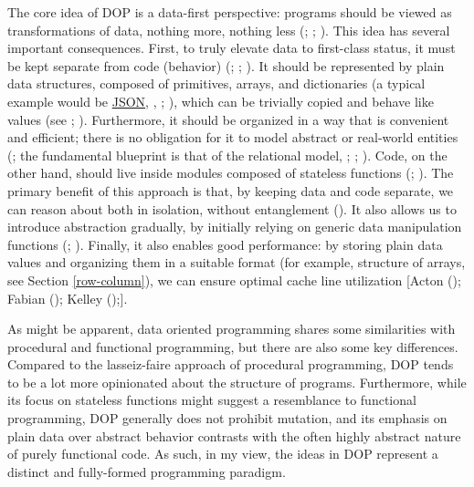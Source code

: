 \documentclass[
  openany]{book}
\theoremstyle{definition}
\theoremstyle{definition}
\theoremstyle{definition}
\theoremstyle{definition}
\theoremstyle{remark}
\begin{document}
The core idea of DOP is a data-first perspective: programs should be viewed as transformations of data, nothing more, nothing less (; ; ). This idea has several important consequences. First, to truly elevate data to first-class status, it must be kept separate from code (behavior) (; ; ). It should be represented by plain data structures, composed of primitives, arrays, and dictionaries (a typical example would be \hyperref[JSON]{JSON}, , ; ), which can be trivially copied and behave like values (see ; ). Furthermore, it should be organized in a way that is convenient and efficient; there is no obligation for it to model abstract or real-world entities (; the fundamental blueprint is that of the relational model, ; ; ). Code, on the other hand, should live inside modules composed of stateless functions (; ). The primary benefit of this approach is that, by keeping data and code separate, we can reason about both in isolation, without entanglement (). It also allows us to introduce abstraction gradually, by initially relying on generic data manipulation functions (; ). Finally, it also enables good performance: by storing plain data values and organizing them in a suitable format (for example, structure of arrays, see Section \ref{row-column}), we can ensure optimal cache line utilization {[}Acton (); Fabian (); Kelley ();{]}.

As might be apparent, data oriented programming shares some similarities with procedural and functional programming, but there are also some key differences. Compared to the lasseiz-faire approach of procedural programming, DOP tends to be a lot more opinionated about the structure of programs. Furthermore, while its focus on stateless functions might suggest a resemblance to functional programming, DOP generally does not prohibit mutation, and its emphasis on plain data over abstract behavior contrasts with the often highly abstract nature of purely functional code. As such, in my view, the ideas in DOP represent a distinct and fully-formed programming paradigm.
\end{document}
